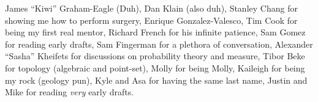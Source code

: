 James ``Kiwi'' Graham-Eagle (Duh), Dan Klain (also duh), Stanley Chang for
showing me how to perform surgery, Enrique Gonzalez-Valesco, Tim Cook for being
my first real mentor, Richard French for his infinite patience, Sam Gomez for
reading early drafts, Sam Fingerman for a plethora of conversation,
Alexander ``Sasha'' Kheifets for discussions on probability theory and measure,
Tibor Beke for topology (algebraic and point-set), Molly for being Molly,
Kaileigh for being my rock (geology pun), Kyle and Asa for having the same
last name, Justin and Mike for reading \textit{very} early drafts.